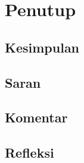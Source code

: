 \section{Penutup}
\subsection{Kesimpulan}
\subsection{Saran}
\subsection{Komentar}
\subsection{Refleksi}

\pagebreak